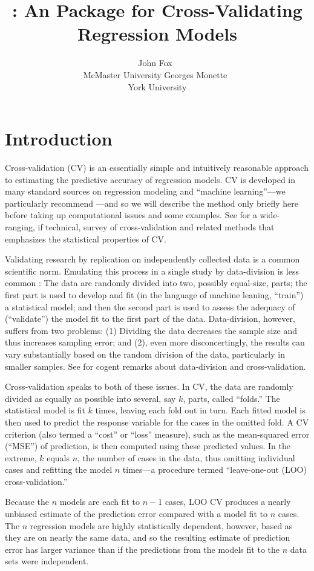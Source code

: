 \documentclass[
]{jss}
\author{
John Fox~\orcidlink{0000-0002-1196-8012}\\McMaster
University \And Georges Monette~\orcidlink{0000-0003-0076-5532}\\York
University
}
\title{\pkg{cv}: An \proglang{R} Package for Cross-Validating Regression
Models}
\begin{document}
\section{Introduction}\label{introduction}

Cross-validation (CV) is an essentially simple and intuitively
reasonable approach to estimating the predictive accuracy of regression
models. CV is developed in many standard sources on regression modeling
and ``machine learning''---we particularly recommend \citet[Secs. 5.1,
5.3]{JamesEtAl:2021}---and so we will describe the method only briefly
here before taking up computational issues and some examples. See
\citet{ArlotCelisse:2010} for a wide-ranging, if technical, survey of
cross-validation and related methods that emphasizes the statistical
properties of CV.

Validating research by replication on independently collected data is a
common scientific norm. Emulating this process in a single study by
data-division is less common \citep[see, e.g.,][]{Barnard:1974}: The
data are randomly divided into two, possibly equal-size, parts; the
first part is used to develop and fit (in the language of machine
leaning, ``train'') a statistical model; and then the second part is
used to assess the adequacy of (``validate'') the model fit to the first
part of the data. Data-division, however, suffers from two problems: (1)
Dividing the data decreases the sample size and thus increases sampling
error; and (2), even more disconcertingly, the results can vary
substantially based on the random division of the data, particularly in
smaller samples. See \citet[Sec.~5.3]{Harrell:2015} for cogent remarks
about data-division and cross-validation.

Cross-validation speaks to both of these issues. In CV, the data are
randomly divided as equally as possible into several, say \(k\), parts,
called ``folds.'' The statistical model is fit \(k\) times, leaving each
fold out in turn. Each fitted model is then used to predict the response
variable for the cases in the omitted fold. A CV criterion (also termed
a ``cost'' or ``loss'' measure), such as the mean-squared error
(``MSE'') of prediction, is then computed using these predicted values.
In the extreme, \(k\) equals \(n\), the number of cases in the data,
thus omitting individual cases and refitting the model \(n\) times---a
procedure termed ``leave-one-out (LOO) cross-validation.''

Because the \(n\) models are each fit to \(n - 1\) cases, LOO CV
produces a nearly unbiased estimate of the prediction error compared
with a model fit to \(n\) cases. The \(n\) regression models are highly
statistically dependent, however, based as they are on nearly the same
data, and so the resulting estimate of prediction error has larger
variance than if the predictions from the models fit to the \(n\) data
sets were independent.
\end{document}

